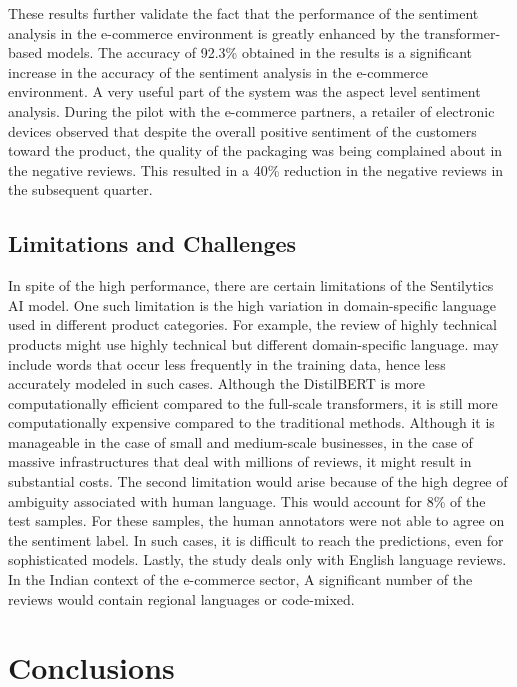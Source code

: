\documentclass[11pt,a4paper]{article}
\begin{document}
These results further validate the fact that the performance of the sentiment analysis in the e-commerce environment is greatly enhanced by the transformer-based models. The accuracy of 92.3\% obtained in the results is a significant increase in the accuracy of the sentiment analysis in the e-commerce environment.
A very useful part of the system was the aspect level sentiment analysis. During the pilot with the e-commerce partners, a retailer of electronic devices observed that despite the overall positive sentiment of the customers toward the product, the quality of the packaging was being complained about in the negative reviews. This resulted in a 40\% reduction in the negative reviews in the subsequent quarter.


\subsection{Limitations and Challenges}

In spite of the high performance, there are certain limitations of the Sentilytics AI model. One such limitation is the high variation in domain-specific language used in different product categories. For example, the review of highly technical products might use highly technical but different domain-specific language.
may include words that occur less frequently in the training data, hence less accurately modeled in such cases. Although the DistilBERT is more computationally efficient compared to the full-scale transformers, it is still more computationally expensive compared to the traditional methods. Although it is manageable in the case of small and medium-scale businesses, in the case of massive infrastructures that deal with millions of reviews, it might result in substantial costs.
The second limitation would arise because of the high degree of ambiguity associated with human language. This would account for 8\% of the test samples. For these samples, the human annotators were not able to agree on the sentiment label. In such cases, it is difficult to reach the predictions, even for sophisticated models.
Lastly, the study deals only with English language reviews. In the Indian context of the e-commerce sector,
A significant number of the reviews would contain regional languages or code-mixed.


\section{Conclusions}
\end{document}
